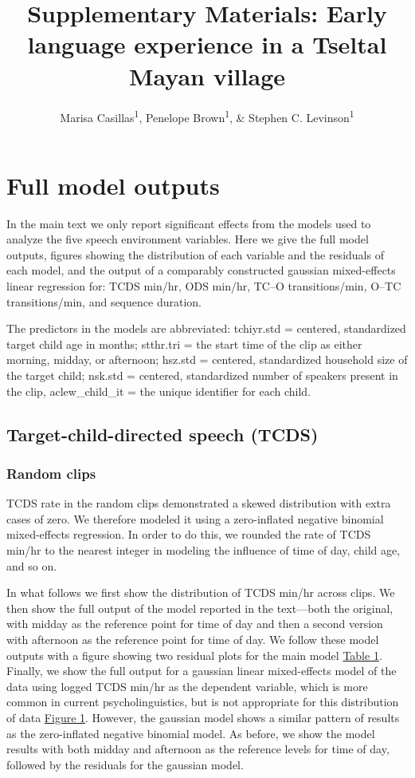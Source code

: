 \documentclass[floatsintext,man]{apa6}
\title{Supplementary Materials: Early language experience in a Tseltal Mayan
village}
\author{Marisa Casillas\textsuperscript{1}, Penelope Brown\textsuperscript{1}, \& Stephen C. Levinson\textsuperscript{1}}
\affiliation{
    \vspace{0.5cm}
          \textsuperscript{1} Max Planck Institute for Psycholinguistics  }
\theoremstyle{definition}
\theoremstyle{definition}
\theoremstyle{definition}
\theoremstyle{remark}
\begin{document}
\maketitle

\setcounter{secnumdepth}{0}



\section{Full model outputs}\label{models}

In the main text we only report significant effects from the models used
to analyze the five speech environment variables. Here we give the full
model outputs, figures showing the distribution of each variable and the
residuals of each model, and the output of a comparably constructed
gaussian mixed-effects linear regression for: TCDS min/hr, ODS min/hr,
TC--O transitions/min, O--TC transitions/min, and sequence duration.

The predictors in the models are abbreviated: tchiyr.std = centered,
standardized target child age in months; stthr.tri = the start time of
the clip as either morning, midday, or afternoon; hsz.std = centered,
standardized household size of the target child; nsk.std = centered,
standardized number of speakers present in the clip, aclew\_child\_it =
the unique identifier for each child.

\subsection{Target-child-directed speech (TCDS)}\label{models-tcds}

\subsubsection{Random clips}\label{models-tcds-random}

TCDS rate in the random clips demonstrated a skewed distribution with
extra cases of zero. We therefore modeled it using a zero-inflated
negative binomial mixed-effects regression. In order to do this, we
rounded the rate of TCDS min/hr to the nearest integer in modeling the
influence of time of day, child age, and so on.

In what follows we first show the distribution of TCDS min/hr across
clips. We then show the full output of the model reported in the
text---both the original, with midday as the reference point for time of
day and then a second version with afternoon as the reference point for
time of day. We follow these model outputs with a figure showing two
residual plots for the main model \protect\hyperlink{tab1}{Table 1}.
Finally, we show the full output for a gaussian linear mixed-effects
model of the data using logged TCDS min/hr as the dependent variable,
which is more common in current psycholinguistics, but is not
appropriate for this distribution of data
\protect\hyperlink{fig1}{Figure 1}. However, the gaussian model shows a
similar pattern of results as the zero-inflated negative binomial model.
As before, we show the model results with both midday and afternoon as
the reference levels for time of day, followed by the residuals for the
gaussian model.
\end{document}
